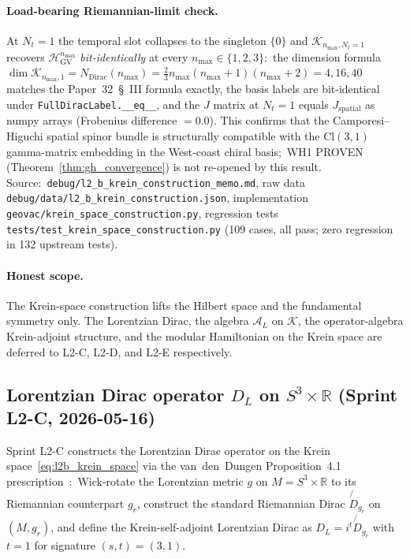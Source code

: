 \documentclass[11pt]{article}
\begin{document}
\paragraph{Load-bearing Riemannian-limit check.}
At $N_t = 1$ the temporal slot collapses to the singleton $\{0\}$ and
$\mathcal{K}_{n_{\max}, N_t = 1}$ recovers $\mathcal{H}_{\mathrm{GV}}^{n_{\max}}$
\emph{bit-identically} at every $n_{\max} \in \{1, 2, 3\}$:\ the
dimension formula $\dim \mathcal{K}_{n_{\max}, 1} = N_{\mathrm{Dirac}}(n_{\max})
= \tfrac{2}{3} n_{\max} (n_{\max} + 1)(n_{\max} + 2) = 4, 16, 40$ matches
the Paper~32~\S~III formula exactly, the basis labels are bit-identical
under \verb|FullDiracLabel.__eq__|, and the $J$ matrix at $N_t = 1$
equals $J_{\mathrm{spatial}}$ as numpy arrays
(Frobenius difference $= 0.0$).  This confirms that the
Camporesi--Higuchi spatial spinor bundle is structurally compatible
with the Cl$(3, 1)$ gamma-matrix embedding in the West-coast chiral
basis;\ WH1 PROVEN
(Theorem~\ref{thm:gh_convergence}) is not re-opened by this result.
Source:\ \verb|debug/l2_b_krein_construction_memo.md|, raw data
\verb|debug/data/l2_b_krein_construction.json|, implementation
\verb|geovac/krein_space_construction.py|, regression tests
\verb|tests/test_krein_space_construction.py| (109 cases, all pass;
zero regression in 132 upstream tests).

\paragraph{Honest scope.}
The Krein-space construction lifts the Hilbert space and the
fundamental symmetry only.  The Lorentzian Dirac, the algebra
$\mathcal{A}_L$ on $\mathcal{K}$, the operator-algebra Krein-adjoint
structure, and the modular Hamiltonian on the Krein space are deferred
to L2-C, L2-D, and L2-E respectively.

\subsection{Lorentzian Dirac operator $D_L$ on $S^3 \times \mathbb{R}$
(Sprint L2-C, 2026-05-16)}
\label{sec:l2c_lorentzian_dirac}

Sprint L2-C constructs the Lorentzian Dirac operator on the Krein
space~\eqref{eq:l2b_krein_space} via the van~den~Dungen Proposition~4.1
prescription~\cite{vandungen2016}:\ Wick-rotate the Lorentzian metric
$g$ on $M = S^3 \times \mathbb{R}$ to its Riemannian counterpart
$g_r$, construct the standard Riemannian Dirac
$\not{\!\!D}_{g_r}$ on $(M, g_r)$, and define the Krein-self-adjoint
Lorentzian Dirac as $D_L = i^t \not{\!\!D}_{g_r}$ with $t = 1$ for
signature $(s, t) = (3, 1)$.
\end{document}
